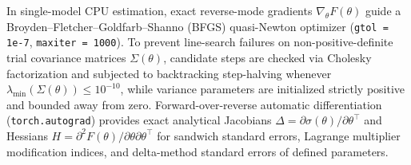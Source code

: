 ﻿\documentclass[12pt,letterpaper]{article}
\begin{document}
In single-model CPU estimation, exact reverse-mode gradients $\nabla_{\theta} F(\theta)$ guide a Broyden--Fletcher--Goldfarb--Shanno (BFGS) quasi-Newton optimizer (\texttt{gtol = 1e-7}, \texttt{maxiter = 1000}). To prevent line-search failures on non-positive-definite trial covariance matrices $\Sigma(\theta)$, candidate steps are checked via Cholesky factorization and subjected to backtracking step-halving whenever $\lambda_{\min}(\Sigma(\theta)) \le 10^{-10}$, while variance parameters are initialized strictly positive and bounded away from zero. Forward-over-reverse automatic differentiation (\texttt{torch.\allowbreak autograd}) provides exact analytical Jacobians $\Delta = \partial \sigma(\theta) / \partial \theta^{\top}$ and Hessians $H = \partial^2 F(\theta) / \partial \theta \partial \theta^{\top}$ for sandwich standard errors, Lagrange multiplier modification indices, and delta-method standard errors of defined parameters.
\end{document}
